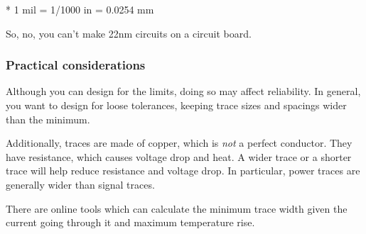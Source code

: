 \documentclass[letterpaper]{article}
\begin{document}
{\sffamily\color[rgb]{0.30980393,0.5058824,0.7411765}
* 1 mil = 1/1000 in = 0.0254 mm}


\bigskip

{\sffamily\color[rgb]{0.30980393,0.5058824,0.7411765}
So, no, you can't make 22nm circuits on a circuit board.}

\subsubsection{Practical considerations}
\hypertarget{Toc337742684}{}{\sffamily\color[rgb]{0.30980393,0.5058824,0.7411765}
Although you can design for the limits, doing so may affect reliability. In general, you want to design for loose
tolerances, keeping trace sizes and spacings wider than the minimum.}

{\sffamily\color[rgb]{0.30980393,0.5058824,0.7411765}
Additionally, traces are made of copper, which is \textit{not} a perfect conductor. They have resistance, which causes
voltage drop and heat. A wider trace or a shorter trace will help reduce resistance and voltage drop. In particular,
power traces are generally wider than signal traces.}

{\sffamily\color[rgb]{0.30980393,0.5058824,0.7411765}
There are online tools which can calculate the minimum trace width given the current going through it and maximum
temperature rise.}
\end{document}
